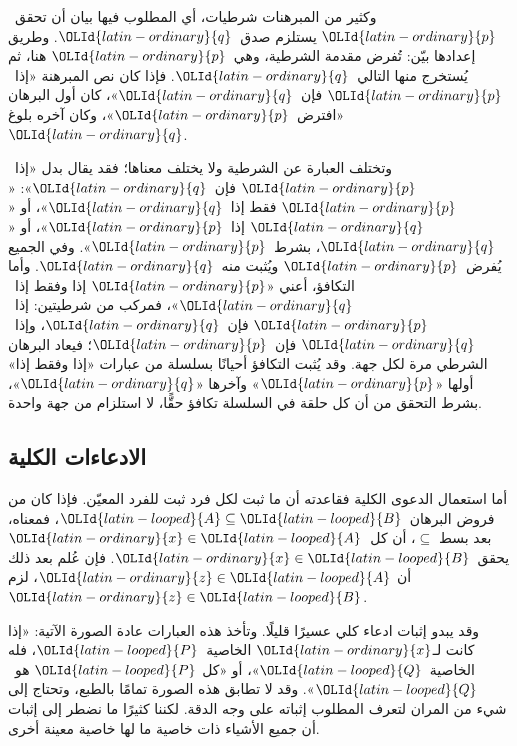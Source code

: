 \documentclass[../../../include/open-logic-section]{subfiles}
\begin{document}
وكثير من المبرهنات شرطيات، أي المطلوب فيها بيان أن تحقق~${\OLId{latin-ordinary}{p}}$ يستلزم
صدق~${\OLId{latin-ordinary}{q}}$. وطريق إعدادها بيّن: تُفرض مقدمة الشرطية، وهي~${\OLId{latin-ordinary}{p}}$ هنا، ثم
يُستخرج منها التالي~${\OLId{latin-ordinary}{q}}$. فإذا كان نص المبرهنة «إذا~${\OLId{latin-ordinary}{p}}$ فإن~${\OLId{latin-ordinary}{q}}$»، كان
أول البرهان «افترض~${\OLId{latin-ordinary}{p}}$»، وكان آخره بلوغ~${\OLId{latin-ordinary}{q}}$.

وتختلف العبارة عن الشرطية ولا يختلف معناها؛ فقد يقال بدل «إذا~${\OLId{latin-ordinary}{p}}$
فإن~${\OLId{latin-ordinary}{q}}$»: «${\OLId{latin-ordinary}{p}}$ فقط إذا~${\OLId{latin-ordinary}{q}}$»، أو «${\OLId{latin-ordinary}{q}}$ إذا~${\OLId{latin-ordinary}{p}}$»، أو «${\OLId{latin-ordinary}{q}}$، بشرط~${\OLId{latin-ordinary}{p}}$».
وفي الجميع يُفرض~${\OLId{latin-ordinary}{p}}$ ويُثبت منه~${\OLId{latin-ordinary}{q}}$. وأما التكافؤ، أعني «${\OLId{latin-ordinary}{p}}$ إذا
وفقط إذا~${\OLId{latin-ordinary}{q}}$»، فمركب من شرطيتين: إذا~${\OLId{latin-ordinary}{p}}$ فإن~${\OLId{latin-ordinary}{q}}$، وإذا~${\OLId{latin-ordinary}{q}}$ فإن~${\OLId{latin-ordinary}{p}}$؛
فيعاد البرهان الشرطي مرة لكل جهة. وقد يُثبت التكافؤ أحيانًا بسلسلة
من عبارات «إذا وفقط إذا» أولها «${\OLId{latin-ordinary}{p}}$» وآخرها «${\OLId{latin-ordinary}{q}}$»، بشرط التحقق من أن
كل حلقة في السلسلة تكافؤ حقًّا، لا استلزام من جهة واحدة.

\subsection{الادعاءات الكلية}

أما استعمال الدعوى الكلية فقاعدته أن ما ثبت لكل فرد ثبت للفرد
المعيّن. فإذا كان من فروض البرهان~${\OLId{latin-looped}{A}} \subseteq {\OLId{latin-looped}{B}}$، فمعناه، بعد بسط
$\subseteq$، أن كل~${\OLId{latin-ordinary}{x}} \in {\OLId{latin-looped}{A}}$ يحقق~${\OLId{latin-ordinary}{x}} \in {\OLId{latin-looped}{B}}$. فإن عُلم بعد ذلك أن
${\OLId{latin-ordinary}{z}} \in {\OLId{latin-looped}{A}}$، لزم~${\OLId{latin-ordinary}{z}} \in {\OLId{latin-looped}{B}}$.

وقد يبدو إثبات ادعاء كلي عسيرًا قليلًا. وتأخذ هذه العبارات عادة
الصورة الآتية: «إذا كانت لـ${\OLId{latin-ordinary}{x}}$ الخاصية~${\OLId{latin-looped}{P}}$، فله الخاصية~${\OLId{latin-looped}{Q}}$»، أو «كل
${\OLId{latin-looped}{P}}$ هو~${\OLId{latin-looped}{Q}}$». وقد لا تطابق هذه الصورة تمامًا بالطبع، وتحتاج إلى شيء
من المران لتعرف المطلوب إثباته على وجه الدقة. لكننا كثيرًا ما نضطر
إلى إثبات أن جميع الأشياء ذات خاصية ما لها خاصية معينة أخرى.
\end{document}
